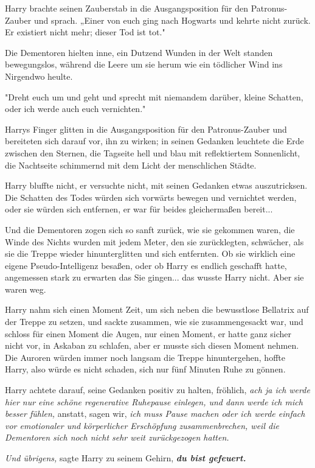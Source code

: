 {Harry brachte seinen Zauberstab in die Ausgangsposition für den Patronus-Zauber und sprach. „Einer von euch ging nach Hogwarts und kehrte nicht zurück. Er existiert nicht mehr; dieser Tod ist tot."

Die Dementoren hielten inne, ein Dutzend Wunden in der Welt standen bewegungslos, während die Leere um sie herum wie ein tödlicher Wind ins Nirgendwo heulte.

"Dreht euch um und geht und sprecht mit niemandem darüber, kleine Schatten, oder ich werde auch euch vernichten."

Harrys Finger glitten in die Ausgangsposition für den Patronus-Zauber und bereiteten sich darauf vor, ihn zu wirken; in seinen Gedanken leuchtete die Erde zwischen den Sternen, die Tagseite hell und blau mit reflektiertem Sonnenlicht, die Nachtseite schimmernd mit dem Licht der menschlichen Städte.

Harry bluffte nicht, er versuchte nicht, mit seinen Gedanken etwas auszutricksen. Die Schatten des Todes würden sich vorwärts bewegen und vernichtet werden, oder sie würden sich entfernen, er war für beides gleichermaßen bereit...

Und die Dementoren zogen sich so sanft zurück, wie sie gekommen waren, die Winde des Nichts wurden mit jedem Meter, den sie zurücklegten, schwächer, als sie die Treppe wieder hinunterglitten und sich entfernten. Ob sie wirklich eine eigene Pseudo-Intelligenz besaßen, oder ob Harry es endlich geschafft hatte, angemessen stark zu erwarten das Sie gingen... das wusste Harry nicht. Aber sie waren weg.

Harry nahm sich einen Moment Zeit, um sich neben die bewusstlose Bellatrix auf der Treppe zu setzen, und sackte zusammen, wie sie zusammengesackt war, und schloss für einen Moment die Augen, nur einen Moment, er hatte ganz sicher nicht vor, in Askaban zu schlafen, aber er musste sich diesen Moment nehmen. Die Auroren würden immer noch langsam die Treppe hinuntergehen, hoffte Harry, also würde es nicht schaden, sich nur fünf Minuten Ruhe zu gönnen.

Harry achtete darauf, seine Gedanken positiv zu halten, fröhlich, \emph{ach ja ich werde hier nur eine schöne regenerative Ruhepause einlegen, und dann werde ich mich besser fühlen,} anstatt, sagen wir, \emph{ich muss Pause machen oder ich werde einfach vor emotionaler und körperlicher Erschöpfung zusammenbrechen, weil die Dementoren sich noch nicht sehr weit zurückgezogen hatten.}

\emph{Und übrigens,} sagte Harry zu seinem Gehirn, \textbf{\emph{du bist gefeuert.}}

}
